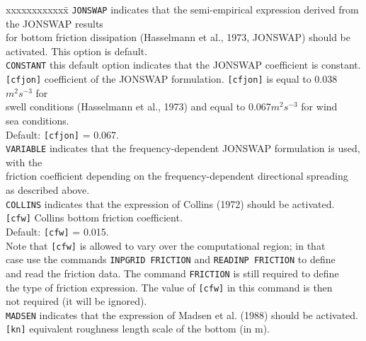 \documentclass[12pt]{book}
\begin{document}
\begin{tabbing}
xxxxxxxxxxxx\= \kill
{\tt JONSWAP}  \> indicates that the semi-empirical expression derived from the JONSWAP results\+\\
                  for bottom friction dissipation (Hasselmann et al., 1973, JONSWAP) should be\\
                  activated. This option is default.\-\\
{\tt CONSTANT} \> this default option indicates that the JONSWAP coefficient is constant.\\
{\tt [cfjon]}  \> coefficient of the JONSWAP formulation. {\tt [cfjon]} is equal to 0.038$m^2 s^{-3}$ for\+\\
                  swell conditions (Hasselmann et al., 1973) and equal to 0.067$m^2 s^{-3}$ for wind\\
                  sea conditions.\\
                  Default: {\tt [cfjon]} = 0.067.\-\\
{\tt VARIABLE} \> indicates that the frequency-dependent JONSWAP formulation is used, with the\+\\
                  friction coefficient depending on the frequency-dependent directional spreading\\
                  as described above.\-\\
{\tt COLLINS}  \> indicates that the expression of Collins (1972) should be activated.\\
{\tt [cfw]}    \> Collins bottom friction coefficient.\+\\
                  Default: {\tt [cfw]} = 0.015.\\
                  Note that {\tt [cfw]} is allowed to vary over the computational region; in that\\
                  case use the commands {\tt INPGRID FRICTION} and {\tt READINP FRICTION} to define\\
                  and read the friction data. The command {\tt FRICTION} is still required to define\\
                  the type of friction expression. The value of {\tt [cfw]} in this command is then\\
                  not required (it will be ignored).\-\\
{\tt MADSEN}   \> indicates that the expression of Madsen et al. (1988) should be activated.\\
{\tt [kn]}     \> equivalent roughness length scale of the bottom (in m).\+\\

\end{tabbing}
\end{document}
